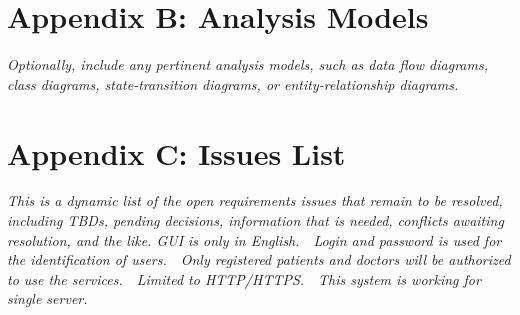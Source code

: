 \documentclass{article}
\begin{document}
\section{Appendix B: Analysis Models}
\emph{Optionally, include any pertinent analysis models, such as data flow diagrams, class diagrams, state-transition diagrams, or entity-relationship diagrams.}
\section{Appendix C: Issues List}
\emph{This is a dynamic list of the open requirements issues that remain to be resolved, including TBDs, pending decisions, information that is needed, conflicts awaiting resolution, and the like.
GUI is only in English.  Login and password is used for the identification of users.  Only registered patients and doctors will be authorized to use the services.  Limited to HTTP/HTTPS.  This system is working for single server.
}
\end{document}
